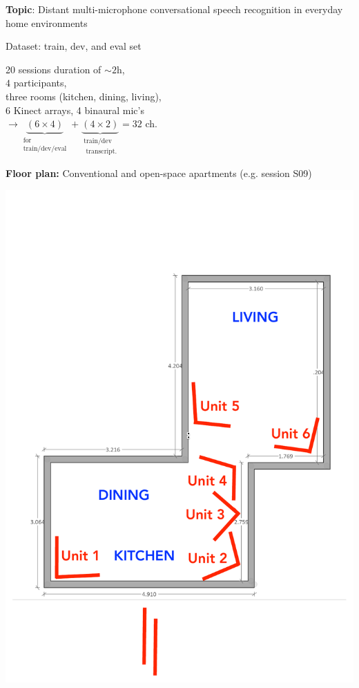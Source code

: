 \documentclass{beamer}
\begin{document}
\begin{frame}
\begin{minipage}[t]{0.49\textwidth}
  \begin{itemize}  
    \item \textbf{Topic}: Distant multi-microphone conversational speech recognition in everyday home environments    
     \item Dataset: train, dev, and eval set
     \item 20 sessions duration of $\sim2$h, \\ 
      $4$ participants, \\
      three rooms (kitchen, dining, living),  \\
      6 Kinect arrays, 4 binaural mic's \\ 
      $\rightarrow \underbrace{(6 \times 4)}_{\substack{\text{for} \\ \text{train/dev/eval}}} + \underbrace{(4 \times 2)}_{\substack{\text{train/dev} \\ \text{ transcript.}}} = 32$ ch.
      \begin{minipage}[b]{0.5\textwidth}    
      \vspace{1em}
        \item \textbf{Floor plan:} Conventional and open-space apartments (e.g. session S09) 
      \end{minipage}%
      \begin{minipage}[c]{0.4\textwidth}
        \centering
        \includegraphics[width=\textwidth]{img/floorplan_S09}
      \end{minipage} 
  \end{itemize}


\end{minipage}
\end{frame}
\end{document}
